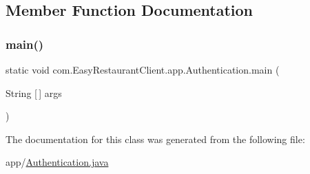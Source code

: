 \subsection{Member Function Documentation}
\mbox{\label{classcom_1_1_easy_restaurant_client_1_1app_1_1_authentication_a37af68d54daa8e6c35126e42e9fc0cca}} 
\subsubsection{\texorpdfstring{main()}{main()}}
{\footnotesize\ttfamily static void com.\+Easy\+Restaurant\+Client.\+app.\+Authentication.\+main (\begin{DoxyParamCaption}\item[{String \mbox{[}$\,$\mbox{]}}]{args }\end{DoxyParamCaption})\hspace{0.3cm}{\ttfamily [static]}}



The documentation for this class was generated from the following file\+:\begin{DoxyCompactItemize}
\item 
app/\mbox{\hyperlink{_authentication_8java}{Authentication.\+java}}\end{DoxyCompactItemize}
